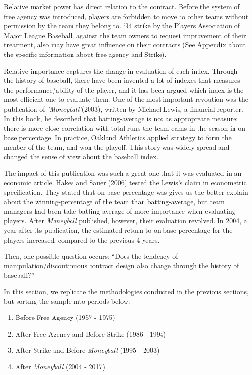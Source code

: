 \documentclass[dvipdfmx, 12pt]{article}
\begin{document}
Relative market power has direct relation to the contract. Before the system of free agency was introduced, players are forbidden to move to other teams without permission by the team they belong to. `94 strike by the Players Association of Major League Baseball, against the team owners to request improvement of their treatment, also may have great influence on their contracts (See Appendix about the specific information about free agency and Strike).

Relative importance captures the change in evaluation of each index. Through the history of baseball, there have been invented a lot of indexes that measures the performance/ability of the player, and it has been argued which index is the most efficient one to evaluate them. One of the most important revoution was the publication of \textit{'Moneyball'}(2003), written by Michael Lewis, a financial reporter. In this book, he described that batting-average is not as appropreate measure: there is more close correlation with total runs the team earns in the season in on-base percentage. In practice, Oakland Athletics applied strategy to form the menber of the team, and won the playoff. This story was widely spread and changed the sense of view about the baseball index.

The impact of this publication was such a great one that it was evaluated in an economic article. Hakes and Sauer (2006) tested the Lewis's claim in econometric specification. They stated that on-base percentage was gives us the better explain about the winning-percentage of the team than batting-average, but team managers had been take batting-average of more importance when evaluating players. After \textit{Moneyball} published, however, their evaluation revolved. In 2004, a year after its publication, the estimated return to on-base percentage for the players increased, compared to the previous 4 years.

Then, one possible question occurs: ``Does the tendency of manipulation/discoutinuous contract design also change through the history of baseball?''

In this section, we replicate the methodologies conducted in the previous sections, but sorting the sample into periods below:

\begin{enumerate}
  \item Before Free Agency (1957 - 1975)

  \item After Free Agency and Before Strike (1986 - 1994)

  \item After Strike and Before \textit{Moneyball} (1995 - 2003)

  \item After \textit{Moneyball} (2004 - 2017)
\end{enumerate}
\end{document}
